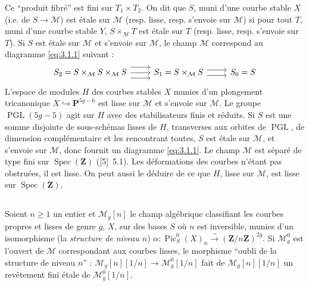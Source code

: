 \documentclass[12pt,a4paper]{article}
\theoremstyle{plain}
\theoremstyle{definition}
\theoremstyle{remark}
\DeclareMathOperator{\Pic}{Pic}
\DeclareMathOperator{\Spec}{Spec}
\DeclareMathOperator{\PGL}{PGL}
\begin{document}
Ce ``produit fibré'' est fini sur $T_1 \times T_2$. On dit que $S$, muni d'une courbe stable $X$ (i.e. de $S \to \mathcal{M}$) est étale sur $\mathcal{M}$ (resp. lisse, resp. s'envoie sur $\mathcal{M}$) si pour tout $T$, muni d'une courbe stable $Y$, $S \times_{\mathcal{M}} T$ est étale sur $T$ (resp. lisse, resp. s'envoie sur $T$). Si $S$ est étale sur $\mathcal{M}$ et s'envoie sur $\mathcal{M}$, le champ $\mathcal{M}$ correspond au diagramme \eqref{eq:3.1.1} suivant :
\[
\begin{tikzcd}
S_2 = S \times_{\mathcal{M}} S \times_{\mathcal{M}} S \arrow[r, shift left=1.5ex] \arrow[r] \arrow[r, shift right=1.5ex] & S_1 = S \times_{\mathcal{M}} S \arrow[r, shift left=0.75ex] \arrow[r, shift right=0.75ex] & S_0 = S
\end{tikzcd}
\]
L'espace de modules $H$ des courbes stables $X$ munies d'un plongement tricanonique $X \hookrightarrow \mathbf{P}^{5g-6}$ est lisse sur $\mathcal{M}$ et s'envoie sur $\mathcal{M}$. Le groupe $\PGL(5g-5)$ agit sur $H$ avec des stabilisateurs finis et réduits. Si $S$ est une somme disjointe de sous-schémas lisses de $H$, transverses aux orbites de $\PGL$, de dimension complémentaire et les rencontrant toutes, $S$ est étale sur $\mathcal{M}$, et s'envoie sur $\mathcal{M}$, donc fournit un diagramme \eqref{eq:3.1.1}. Le champ $\mathcal{M}$ est séparé de type fini sur $\Spec(\mathbf{Z})$ ([5]~5.1). Les déformations des courbes n'étant pas obstruées, il est lisse. On peut aussi le déduire de ce que $H$, lisse sur $\mathcal{M}$, est lisse sur $\Spec(\mathbf{Z})$.

\subsection{} Soient $n \geq 1$ un entier et $\mathcal{M}_g[n]$ le champ algébrique classifiant les courbes propres et lisses de genre $g$, $X$, sur des bases $S$ où $n$ est inversible, munies d'un isomorphisme (la \emph{structure de niveau $n$}) $\alpha : \Pic_S^0(X)_n \xrightarrow{\sim} (\mathbf{Z}/n\mathbf{Z})^{2g}$. Si $\mathcal{M}_g^0$ est l'ouvert de $\mathcal{M}$ correspondant aux courbes lisses, le morphisme ``oubli de la structure de niveau $n$'' : $\mathcal{M}_g[n][1/n] \to \mathcal{M}_g^0[1/n]$ fait de $\mathcal{M}_g[n][1/n]$ un revêtement fini étale de $\mathcal{M}_g^0[1/n]$.

\subsection{}\label{sec:3.4}
\end{document}
